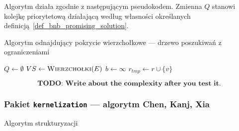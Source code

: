 \par{
  Algorytm działa zgodnie z następującym pseudokodem.
  Zmienna $Q$ stanowi kolejkę priorytetową działającą według własności określanych definicją~\ref{def_bnb_promising_solution}.
  \begin{algorithm}
    \caption{Algorytm odnajdujący pokrycie wierzchołkowe --- drzewo poszukiwań z ograniczeniami}\label{alg_VC2}
    \begin{algorithmic}[1]



        \State $Q \gets \emptyset$
        \State $VS \gets \Call{Wierzchołki}{E}$
        \State $b \gets \infty$
            \EndIf
            \Else
              \label{bnb_forLoop}
                \EndIf
                \State$r_{tmp} \gets r \cup \{v\}$
                \EndIf
              \EndFor
            \EndIf
          \EndIf
        \EndWhile
      \EndFunction
    \end{algorithmic}
  \end{algorithm}
  \[
    \textbf{TODO: Write about the complexity after you test it.}
  \]

\subsubsection{\textbf{Pakiet \texttt{kernelization} --- algorytm Chen, Kanj, Xia}}
\label{sss_internals_ckx}
\begin{algorithm}
  \caption{Algorytm strukturyzacji}\label{alg_ckx_struction}
  \begin{algorithmic}[1]


\end{algorithmic}
\end{algorithm}}
